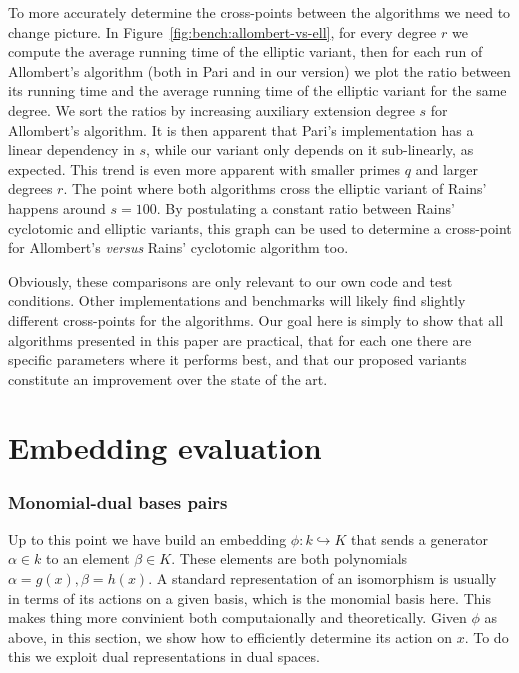 \documentclass[12pt]{article}
\theoremstyle{plain}
\theoremstyle{definition}
\newcounter{algorithm}
\begin{document}
To more accurately determine the cross-points between the algorithms
we need to change picture. In Figure~\ref{fig:bench:allombert-vs-ell},
for every degree $r$ we compute the average running time of the
elliptic variant, then for each run of Allombert's algorithm (both in
Pari and in our version) we plot the ratio between its running time
and the average running time of the elliptic variant for the same
degree. We sort the ratios by increasing auxiliary extension degree
$s$ for Allombert's algorithm. It is then apparent that Pari's
implementation has a linear dependency in $s$, while our variant only
depends on it sub-linearly, as expected. This trend is even more
apparent with smaller primes $q$ and larger degrees $r$. The point
where both algorithms cross the elliptic variant of Rains' happens
around $s=100$. By postulating a constant ratio between Rains'
cyclotomic and elliptic variants, this graph can be used to determine
a cross-point for Allombert's \emph{versus} Rains' cyclotomic
algorithm too.

Obviously, these comparisons are only relevant to our own code and
test conditions. Other implementations and benchmarks will likely find
slightly different cross-points for the algorithms. Our goal here is
simply to show that all algorithms presented in this paper are
practical, that for each one there are specific parameters where it
performs best, and that our proposed variants constitute an
improvement over the state of the art.



\part{Embedding evaluation}
\label{part:eval}



\section{Monomial-dual bases pairs}


Up to this point we have build an embedding $\phi: k \hookrightarrow K$ that sends a generator $\alpha \in k$ to an element $\beta \in K$. These elements are both polynomials $\alpha = g(x), \beta = h(x)$. A standard representation of an isomorphism is usually in terms of its actions on a given basis, which is the monomial basis here. This makes thing more convinient both computaionally and theoretically. Given $\phi$ as above, in this section, we show how to efficiently determine its action on $x$. To do this we exploit dual representations in dual spaces.
\end{document}
